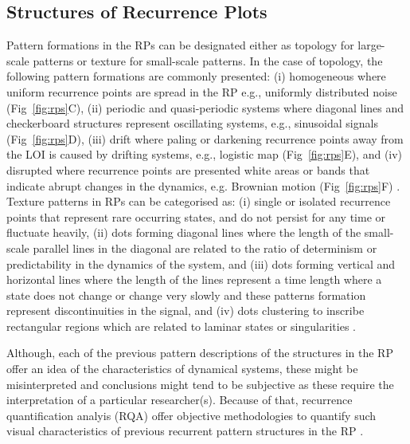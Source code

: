 \documentclass[fleqn,10pt]{wlscirep}
\begin{document}
\subsection*{Structures of Recurrence Plots}
Pattern formations in the RPs can be designated either 
as topology for large-scale patterns or texture for small-scale patterns.
In the case of topology, the following pattern formations are commonly presented:
(i) homogeneous where uniform recurrence points are spread in the RP e.g., 
uniformly distributed noise (Fig~\ref{fig:rps}C), 
(ii) periodic and quasi-periodic systems where diagonal lines and 
checkerboard structures represent oscillating systems, e.g., sinusoidal 
signals (Fig~\ref{fig:rps}D), 
(iii) drift where paling or darkening recurrence points away from 
the LOI is caused by drifting systems, 
e.g., logistic map (Fig~\ref{fig:rps}E), and
(iv) disrupted where recurrence points are presented white areas or 
bands that indicate abrupt changes in the dynamics, e.g. Brownian motion 
(Fig~\ref{fig:rps}F) \cite{eckmann1987, marwan2015}.
Texture patterns in RPs can be categorised as:
(i) single or isolated recurrence points that represent rare occurring states, 
and do not persist for any time or fluctuate heavily,
(ii) dots forming diagonal lines where the length of the small-scale parallel 
lines in the diagonal are related to the ratio of determinism or predictability 
in the dynamics of the system, and
(iii) dots forming vertical and horizontal lines where the length of the 
lines represent a time length where a state does not change or change very 
slowly and these patterns formation represent discontinuities in the signal, 
and (iv) dots clustering to inscribe rectangular regions which are related 
to laminar states or singularities \cite{marwan2015}.

Although, each of the previous pattern descriptions of the structures in the 
RP offer an idea of the characteristics of dynamical systems, 
these might be misinterpreted and conclusions might tend to be subjective 
as these require the interpretation of a particular researcher(s).
Because of that, recurrence quantification analyis (RQA) offer objective 
methodologies to quantify such visual characteristics of previous 
recurrent pattern structures in the RP \cite{zbilut1992}.
\end{document}
